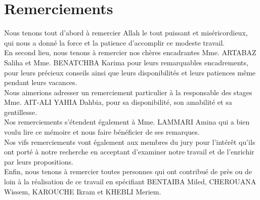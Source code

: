 \chapter*{Remerciements}%


\tab Nous tenons tout d’abord à remercier Allah le tout puissant et miséricordieux, qui nous a donné la force et la patience d’accomplir ce modeste travail.\vspace{10px} \\
	\tab En second lieu, nous tenons à remercier nos chères encadrantes Mme. ARTABAZ Saliha et Mme. BENATCHBA Karima 	pour	leurs remarquables encadrements, pour	leurs	précieux conseils	 ainsi	que	leurs disponibilités	et	leurs patiences même pendant leurs vacances. \vspace{10px} \\
	\tab Nous aimerions adresser un remerciement particulier à la responsable des stages Mme. AIT-ALI YAHIA Dahbia, pour sa disponibilité, son amabilité et sa gentillesse.\vspace{10px} \\
	\tab Nos remerciements s’étendent également à Mme. LAMMARI Amina qui a bien voulu lire ce mémoire et nous faire bénéficier de ses remarques. \vspace{10px} \\
	\tab Nos vifs remerciements vont également aux membres du jury pour l’intérêt qu’ils ont porté à notre recherche en acceptant d’examiner notre travail et de l’enrichir par leurs propositions. \vspace{10px} \\	
	\tab Enfin, nous tenons à remercier toutes personnes qui ont contribué de près ou de loin à la réalisation de ce travail en spécifiant BENTAIBA Miled, CHEROUANA Wissem, KAROUCHE Ikram et KHEBLI Meriem.
 
